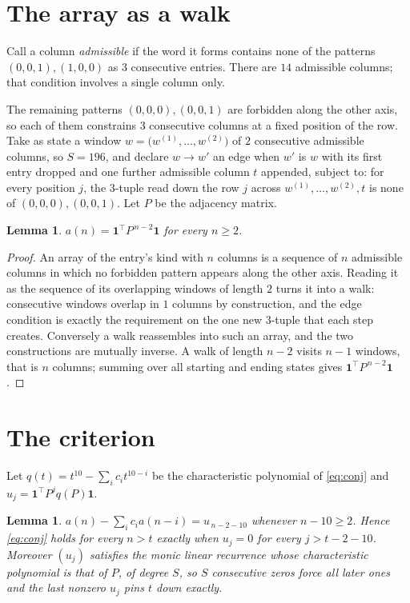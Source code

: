 \documentclass[11pt,a4paper]{article}
\theoremstyle{plain}
\newtheorem{lemma}[theorem]{Lemma}
\theoremstyle{definition}
\begin{document}
\section{The array as a walk}

Call a column \emph{admissible} if the word it forms contains none of the patterns
$(0,0,1), (1,0,0)$ as $3$ consecutive entries. There are $14$ admissible columns; that condition
involves a single column only.

The remaining patterns $(0,0,0), (0,0,1)$ are forbidden along the other axis, so each of them
constrains $3$ consecutive columns at a fixed position of the row. Take as state a
window $w=\bigl(w^{(1)},\dots,w^{(2)}\bigr)$ of $2$ consecutive admissible
columns, so $S=196$, and declare $w\to w'$ an edge when $w'$ is $w$ with its first entry
dropped and one further admissible column $t$ appended, subject to: for every position
$j$, the $3$-tuple read down the row $j$ across $w^{(1)},\dots,w^{(2)},t$
is none of $(0,0,0), (0,0,1)$. Let $P$ be the adjacency matrix.

\begin{lemma}\label{lem:walk}
$a(n)=\mathbf{1}^{\!\top}P^{\,n-2}\mathbf{1}$ for every $n\ge2$.
\end{lemma}

\begin{proof}
An array of the entry's kind with $n$ columns is a sequence of $n$ admissible columns in
which no forbidden pattern appears along the other axis. Reading it as the sequence of its
overlapping windows of length $2$ turns it into a walk: consecutive windows overlap in
$1$ columns by construction, and the edge condition is exactly the requirement on the one
new $3$-tuple that each step creates. Conversely a walk reassembles into such an array,
and the two constructions are mutually inverse. A walk of length $n-2$ visits $n-1$
windows, that is $n$ columns; summing over all starting and ending states gives
$\mathbf{1}^{\!\top}P^{\,n-2}\mathbf{1}$.
\end{proof}

\section{The criterion}

Let $q(t)=t^{10}-\sum_i c_i t^{10-i}$ be the characteristic polynomial of
\eqref{eq:conj} and $u_j=\mathbf{1}^{\!\top}P^{j}q(P)\mathbf{1}$.

\begin{lemma}\label{lem:crit}
$a(n)-\sum_i c_i a(n-i)=u_{\,n-2-10}$ whenever $n-10\ge2$. Hence
\eqref{eq:conj} holds for every $n>t$ exactly when $u_j=0$ for every
$j>t-2-10$. Moreover $(u_j)$ satisfies the monic linear recurrence whose
characteristic polynomial is that of $P$, of degree $S$, so $S$ consecutive zeros force all
later ones and the last nonzero $u_j$ pins $t$ down exactly.
\end{lemma}
\end{document}
